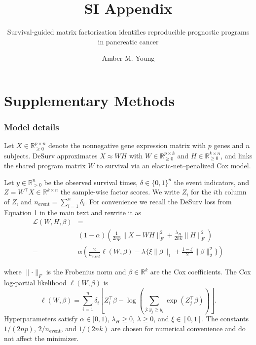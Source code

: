 \documentclass[
]{article}
\title{SI Appendix}
\subtitle{Survival-guided matrix factorization identifies reproducible
prognostic programs in pancreatic cancer}
\author{Amber M. Young}
\date{}
\begin{document}
\maketitle

{
\setcounter{tocdepth}{2}
\tableofcontents
}
\newpage
{}
{}
\listoffigures
\newpage
{}
{}
\listoftables
\newpage

\part{Supplementary Methods}

\section{Model details}

Let \(X \in \mathbb{R}_{\ge 0}^{p \times n}\) denote the nonnegative
gene expression matrix with \(p\) genes and \(n\) subjects. DeSurv
approximates \(X \approx WH\) with
\(W \in \mathbb{R}_{\ge 0}^{p \times k}\) and
\(H \in \mathbb{R}_{\ge 0}^{k \times n}\), and links the shared program
matrix \(W\) to survival via an elastic-net--penalized Cox model.

Let \(y \in \mathbb{R}^n_{> 0}\) be the observed survival times,
\(\delta \in \{0,1\}^n\) the event indicators, and
\(Z = W^\top X \in \mathbb{R}^{k \times n}\) the sample-wise factor
scores. We write \(Z_i\) for the \(i\)th column of \(Z\), and
\(n_{\text{event}} = \sum_{i=1}^n \delta_i\). For convenience we recall
the DeSurv loss from Equation 1 in the main text and rewrite it as
\begin{align}
  \mathcal{L}(W,H,\beta) &=\nonumber \\
  &(1-\alpha)\left(\frac{1}{2np}\lVert X - WH \rVert_F^2 + \frac{\lambda_H}{2nk} \lVert H \rVert_F^2\right) \nonumber \\
  -&\alpha \left(\frac{2}{n_{event}}\ell(W,\beta) - \lambda \{ \xi \lVert \beta \rVert_1 + \tfrac{1-\xi}{2} \lVert \beta \rVert_2^2 \} \right) \nonumber
\end{align}

where \(\lVert \cdot \rVert_F\) is the Frobenius norm and
\(\beta \in \mathbb{R}^k\) are the Cox coefficients. The Cox log-partial
likelihood \(\ell(W,\beta)\) is \begin{equation}
\ell(W,\beta)
=
\sum_{i=1}^n
\delta_i
\left[
  Z_i^\top \beta
  -
  \log \left(
    \sum_{j : y_j \ge y_i}
    \exp(Z_j^\top \beta)
  \right)
\right].
\end{equation} Hyperparameters satisfy \(\alpha \in [0,1)\),
\(\lambda_H \ge 0\), \(\lambda \ge 0\), and \(\xi \in [0,1]\). The
constants \(1/(2np)\), \(2/n_{\text{event}}\), and \(1/(2nk)\) are
chosen for numerical convenience and do not affect the minimizer.
\end{document}
